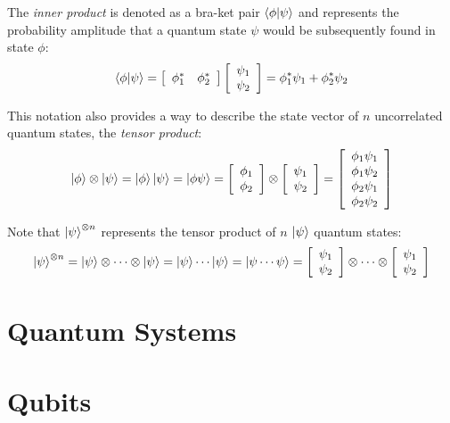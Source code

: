 The \textit{inner product} is denoted as a bra-ket pair $\left\langle{\phi}|{\psi}\right\rangle$ and represents the probability amplitude that a quantum state $\psi$ would be subsequently found in state $\phi$:
$$\left\langle{\phi}|{\psi}\right\rangle=\left[\begin{array}{cc}\phi_{1}^{*} & \phi_{2}^{*} \end{array}\right]\left[\begin{array}{c}\psi_{1} \\ \psi_{2} \end{array}\right]=\phi_{1}^{*}\psi_{1}+\phi_{2}^{*}\psi_{2}$$

This notation also provides a way to describe the state vector of $n$ uncorrelated quantum states, the \textit{tensor product}:
$$\left|{\phi}\right\rangle\otimes\left|{\psi}\right\rangle=\left|{\phi}\right\rangle\left|{\psi}\right\rangle=\left|{\phi\psi}\right\rangle=\left[\begin{array}{c}\phi_{1} \\ \phi_{2}\end{array}\right]\otimes\left[\begin{array}{c}\psi_{1} \\ \psi_{2}\end{array}\right]=\left[\begin{array}{c}\phi_{1}\psi_{1} \\ \phi_{1}\psi_{2} \\ \phi_{2}\psi_{1} \\ \phi_{2}\psi_{2}\end{array}\right]$$

Note that $\left|{\psi}\right\rangle^{\otimes n}$ represents the tensor product of $n$ $\left|{\psi}\right\rangle$ quantum states:
$$\left|{\psi}\right\rangle^{\otimes n}=\left|{\psi}\right\rangle\otimes\cdots\otimes\left|{\psi}\right\rangle=\left|{\psi}\right\rangle\cdots\left|{\psi}\right\rangle=\left|{\psi\cdots\psi}\right\rangle=\left[\begin{array}{c}\psi_{1} \\ \psi_{2} \end{array}\right]\otimes\cdots\otimes\left[\begin{array}{c}\psi_{1} \\ \psi_{2} \end{array}\right]$$

\section{Quantum Systems}


\section{Qubits}

